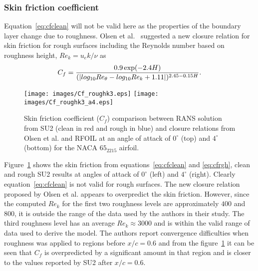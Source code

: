 \subsubsection{Skin friction coefficient}
Equation~\ref{eq:cfclean} will not be valid here as the properties of the boundary layer change due to roughness. Olsen et al.~\cite{olsen2020improved} suggested a new closure relation for skin friction for rough surfaces including the Reynolds number based on roughness height, $Re_k = u_e k/\nu$ as
\begin{eqnarray}
\noindent C_f = \frac{0.9\exp(-2.4H)}{(|log_{10}Re_{\theta}-log_{10}Re_k+1.11|)^{2.45-0.15H}} .
    \label{eq:cfrgh}
\end{eqnarray}
\begin{figure}[h!]
    \centering
    \captionsetup{justification=centering}
    \texttt{[image: images/Cf\_roughk3.eps]} 
    \texttt{[image: images/Cf\_roughk3\_a4.eps]}
    \caption{Skin friction coefficient ($C_f$) comparison between RANS solution from SU2 (clean in red and rough in blue) and closure relations from Olsen et al.\cite{olsen2020improved} and RFOIL\cite{rfoil_orig} at an angle of attack of $0^{\circ}$ (top) and $4^{\circ}$ (bottom) for the NACA $65_2215$ airfoil.}
    \label{fig:a0cf_rough}
\end{figure}

Figure~\ref{fig:a0cf_rough} shows the skin friction from equations~\ref{eq:cfclean} and \ref{eq:cfrgh}, clean and rough SU2 results at angles of attack of $0^{\circ}$ (left) and $4^{\circ}$ (right). Clearly equation~\ref{eq:cfclean} is not valid for rough surfaces. The new closure relation proposed by Olsen et al. appears to overpredict the skin friction. However, since the computed $Re_k$ for the first two roughness levels are approximately $400$ and $800$, it is outside the range of the data used by the authors in their study. The third roughness level has an average $Re_k \approx 3000$ and is within the valid range of data used to derive the model. The authors report convergence difficulties when roughness was applied to regions before $x/c=0.6$ and from the figure~\ref{fig:a0cf_rough} it can be seen that $C_f$ is overpredicted by a significant amount in that region and is closer to the values reported by SU2 after $x/c=0.6$.

